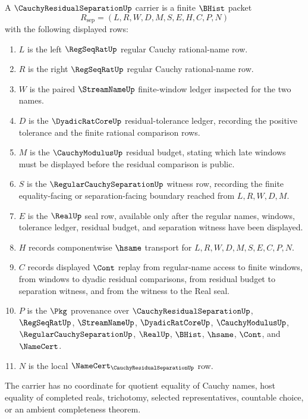 \begin{definition}
\label{def:cauchy-residual-separation-carrier}
A $\CauchyResidualSeparationUp$ carrier is a finite $\BHist$ packet
$$
R_{\mathrm{sep}}=(L,R,W,D,M,S,E,H,C,P,N)
$$
with the following displayed rows:
\begin{enumerate}
\item $L$ is the left $\RegSeqRatUp$ regular Cauchy rational-name row.
\item $R$ is the right $\RegSeqRatUp$ regular Cauchy rational-name row.
\item $W$ is the paired $\StreamNameUp$ finite-window ledger inspected for the two names.
\item $D$ is the $\DyadicRatCoreUp$ residual-tolerance ledger, recording the positive tolerance and the finite rational comparison rows.
\item $M$ is the $\CauchyModulusUp$ residual budget, stating which late windows must be displayed before the residual comparison is public.
\item $S$ is the $\RegularCauchySeparationUp$ witness row, recording the finite equality-facing or separation-facing boundary reached from $L,R,W,D,M$.
\item $E$ is the $\RealUp$ seal row, available only after the regular names, windows, tolerance ledger, residual budget, and separation witness have been displayed.
\item $H$ records componentwise $\hsame$ transport for $L,R,W,D,M,S,E,C,P,N$.
\item $C$ records displayed $\Cont$ replay from regular-name access to finite windows, from windows to dyadic residual comparisons, from residual budget to separation witness, and from the witness to the Real seal.
\item $P$ is the $\Pkg$ provenance over $\CauchyResidualSeparationUp$, $\RegSeqRatUp$, $\StreamNameUp$, $\DyadicRatCoreUp$, $\CauchyModulusUp$, $\RegularCauchySeparationUp$, $\RealUp$, $\BHist$, $\hsame$, $\Cont$, and $\NameCert$.
\item $N$ is the local $\NameCert_{\CauchyResidualSeparationUp}$ row.
\end{enumerate}
The carrier has no coordinate for quotient equality of Cauchy names, host equality of completed reals, trichotomy, selected representatives, countable choice, or an ambient completeness theorem.
\end{definition}

